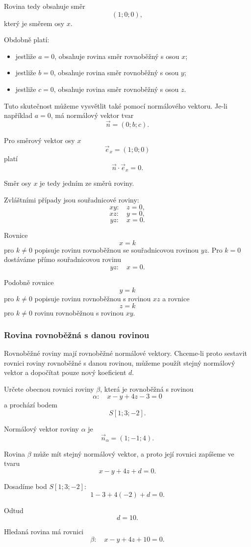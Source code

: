 Rovina tedy obsahuje směr
\[
    (1;0;0),
\]
který je směrem osy $x$.

Obdobně platí:

\begin{itemize}
    \item jestliže $a=0$, obsahuje rovina směr rovnoběžný s osou $x$;
    \item jestliže $b=0$, obsahuje rovina směr rovnoběžný s osou $y$;
    \item jestliže $c=0$, obsahuje rovina směr rovnoběžný s osou $z$.
\end{itemize}

Tuto skutečnost můžeme vysvětlit také pomocí normálového vektoru.
Je-li například $a=0$, má normálový vektor tvar
\[
    \vec{n}=(0;b;c).
\]

Pro směrový vektor osy $x$
\[
    \vec{e}_x=(1;0;0)
\]
platí
\[
    \vec{n}\cdot\vec{e}_x=0.
\]

Směr osy $x$ je tedy jedním ze směrů roviny.

Zvláštními případy jsou souřadnicové roviny:
\[
    xy:\quad z=0,
\]
\[
    xz:\quad y=0,
\]
\[
    yz:\quad x=0.
\]

Rovnice
\[
    x=k
\]
pro $k\neq0$ popisuje rovinu rovnoběžnou se souřadnicovou rovinou
$yz$. Pro $k=0$ dostáváme přímo souřadnicovou rovinu
\[
    yz:\quad x=0.
\]

Podobně rovnice
\[
    y=k
\]
pro $k\neq0$ popisuje rovinu rovnoběžnou s rovinou $xz$ a rovnice
\[
    z=k
\]
pro $k\neq0$ rovinu rovnoběžnou s rovinou $xy$.


\subsubsection{Rovina rovnoběžná s danou rovinou}
\label{subsubsec:Parallel_plane_through_point}

Rovnoběžné roviny mají rovnoběžné normálové vektory. Chceme-li proto
sestavit rovnici roviny rovnoběžné s danou rovinou, můžeme použít
stejný normálový vektor a dopočítat pouze nový koeficient $d$.

\begin{example}
    \label{exa:Parallel_plane_through_point}

    Určete obecnou rovnici roviny $\beta$, která je rovnoběžná s rovinou
    \[
        \alpha:\quad x-y+4z-3=0
    \]
    a prochází bodem
    \[
        S[1;3;-2].
    \]

    Normálový vektor roviny $\alpha$ je
    \[
        \vec{n}_{\alpha}=(1;-1;4).
    \]

    Rovina $\beta$ může mít stejný normálový vektor, a proto její rovnici
    zapíšeme ve tvaru
    \[
        x-y+4z+d=0.
    \]

    Dosadíme bod $S[1;3;-2]$:
    \[
        1-3+4(-2)+d=0.
    \]

    Odtud
    \[
        d=10.
    \]

    Hledaná rovina má rovnici
    \[
        \beta:\quad x-y+4z+10=0.
    \]
\end{example}

